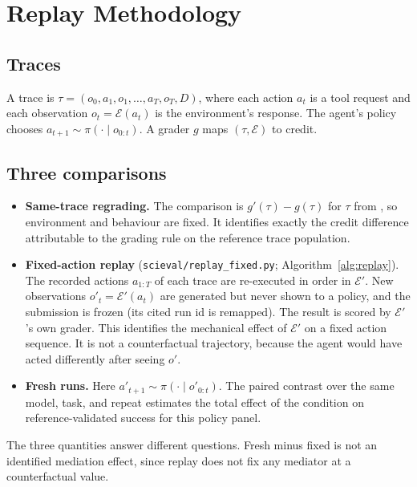 \section{Replay Methodology}
\label{app:replay}

\subsection{Traces}
A trace is
$\tau=(o_0,a_1,o_1,\dots,a_T,o_T,D)$, where each action $a_t$ is a tool
request and each observation $o_t=\mathcal{E}(a_t)$ is the environment's
response. The agent's policy chooses $a_{t+1}\sim\pi(\cdot\mid o_{0:t})$. A
grader $g$ maps $(\tau,\mathcal{E})$ to credit.

\subsection{Three comparisons}
\label{app:replay-modes}
\begin{itemize}
\item \textbf{Same-trace regrading.} The comparison is
$g'(\tau)-g(\tau)$ for $\tau$ from , so environment and behaviour
are fixed. It identifies exactly the credit difference attributable to the
grading rule on the reference trace population.
\item \textbf{Fixed-action replay} (\texttt{scieval/replay\_fixed.py};
Algorithm~\ref{alg:replay}). The recorded actions $a_{1:T}$ of each
 trace are re-executed in order in $\mathcal{E}'$. New observations
$o'_t=\mathcal{E}'(a_t)$ are generated but never shown to a policy, and the
submission is frozen (its cited run id is remapped). The result is scored by
$\mathcal{E}'$'s own grader. This identifies the mechanical effect of
$\mathcal{E}'$ on a fixed action sequence. It is not a counterfactual
trajectory, because the agent would have acted differently after seeing
$o'$.
\item \textbf{Fresh runs.} Here $a'_{t+1}\sim\pi(\cdot\mid o'_{0:t})$. The
paired contrast over the same model, task, and repeat estimates the total
effect of the condition on reference-validated success for this policy panel.
\end{itemize}
The three quantities answer different questions. Fresh minus fixed is not an
identified mediation effect, since replay does not fix any mediator at a
counterfactual value.

